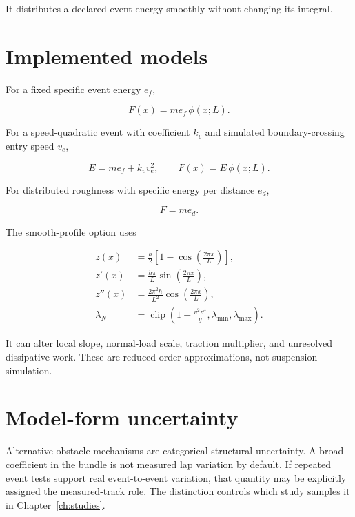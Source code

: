 \documentclass[11pt,oneside]{report}
\begin{document}
It distributes a declared event energy smoothly without changing its integral.

\section{Implemented models}

For a fixed specific event energy $e_f$,

\begin{equation}
F(x)=m e_f\,\phi(x;L).
\end{equation}

For a speed-quadratic event with coefficient $k_v$ and simulated boundary-crossing
entry speed $v_e$,

\begin{equation}
E=m e_f+k_v v_e^2,\qquad F(x)=E\,\phi(x;L).
\label{eq:speed-obstacle}
\end{equation}

For distributed roughness with specific energy per distance $e_d$,

\begin{equation}
F=m e_d.
\end{equation}

The smooth-profile option uses

\begin{align}
z(x)&=\frac{h}{2}\left[1-\cos\left(\frac{2\pi x}{L}\right)\right],\\
z'(x)&=\frac{h\pi}{L}\sin\left(\frac{2\pi x}{L}\right),\\
z''(x)&=\frac{2\pi^2h}{L^2}\cos\left(\frac{2\pi x}{L}\right),\\
\lambda_N&=\operatorname{clip}\left(1+\frac{v^2z''}{g},
\lambda_{\min},\lambda_{\max}\right).
\end{align}

It can alter local slope, normal-load scale, traction multiplier, and unresolved
dissipative work.  These are reduced-order approximations, not suspension simulation.

\section{Model-form uncertainty}

Alternative obstacle mechanisms are categorical structural uncertainty.  A broad
coefficient in the bundle is not measured lap variation by default.  If repeated event
tests support real event-to-event variation, that quantity may be explicitly assigned
the measured-track role.  The distinction controls which study samples it in
Chapter~\ref{ch:studies}.
\end{document}
